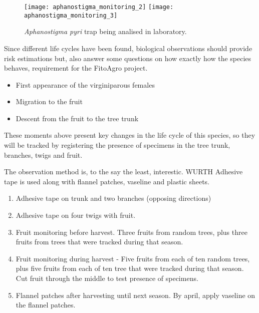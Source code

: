 \begin{figure}[htbp]
  \centering
    {\texttt{[image: aphanostigma\_monitoring\_2]}}%
  \hfill
    {\texttt{[image: aphanostigma\_monitoring\_3]}}%
  \caption{\textit{Aphanostigma pyri} trap being analised in laboratory.}
  \label{fig:cydia_figs}
\end{figure}

Since different life cycles have been found, biological observations should provide risk estimations but, also answer some questions on how exactly how the species behaves, requirement for the FitoAgro project.

\begin{itemize}
	\item First appearance of the virginiparous females
	\item Migration to the fruit
	\item Descent from the fruit to the tree trunk
\end{itemize}

These moments above present key changes in the life cycle of this species, so they will be tracked by registering the presence of specimens in the tree trunk, branches, twigs and fruit.

The observation method is, to the say the least, interestic. WURTH Adhesive tape is used along with flannel patches, vaseline and plastic sheets. 

\begin{enumerate}
	\item Adhesive tape on trunk and two branches (opposing directions)
	\item Adhesive tape on four twigs with fruit.
	\item Fruit monitoring before harvest. Three fruits from random trees, plus three fruits from trees that were tracked during that season.
	\item Fruit monitoring during harvest - Five fruits from each of ten random trees, plus five fruits from each of ten tree that were tracked during that season. Cut fruit through the middle to test presence of specimens.
	\item Flannel patches after harvesting until next season. By april, apply vaseline on the flannel patches.
\end{enumerate}


